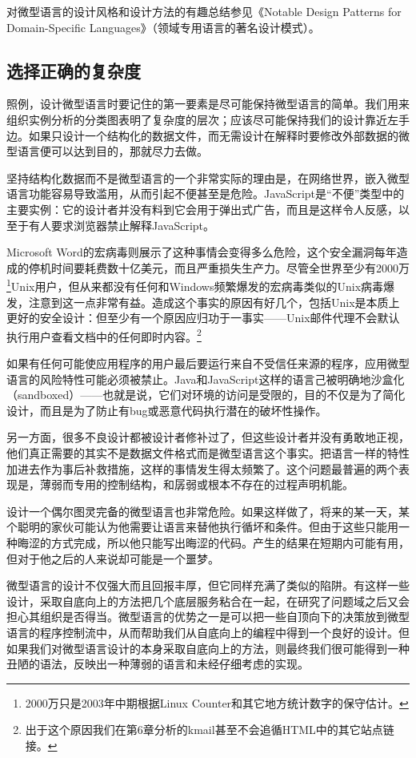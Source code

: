 \documentclass[12pt,oneside]{book}
\begin{document}
对微型语言的设计风格和设计方法的有趣总结参见《Notable Design Patterns for Domain-Specific Languages》（领域专用语言的著名设计模式）\cite{Spinellis}。


\subsection{选择正确的复杂度}
照例，设计微型语言时要记住的第一要素是尽可能保持微型语言的简单。我们用来组织实例分析的分类图表明了复杂度的层次；应该尽可能保持我们的设计靠近左手边。如果只设计一个结构化的数据文件，而无需设计在解释时要修改外部数据的微型语言便可以达到目的，那就尽力去做。

坚持结构化数据而不是微型语言的一个非常实际的理由是，在网络世界，嵌入微型语言功能容易导致滥用，从而引起不便甚至是危险。JavaScript是“不便”类型中的主要实例：它的设计者并没有料到它会用于弹出式广告，而且是这样令人反感，以至于有人要求浏览器禁止解释JavaScript。

Microsoft Word的宏病毒则展示了这种事情会变得多么危险，这个安全漏洞每年造成的停机时间要耗费数十亿美元，而且严重损失生产力。尽管全世界至少有2000万\footnote{2000万只是2003年中期根据Linux Counter和其它地方统计数字的保守估计。}Unix用户，但从来都没有任何和Windows频繁爆发的宏病毒类似的Unix病毒爆发，注意到这一点非常有益。造成这个事实的原因有好几个，包括Unix是本质上更好的安全设计：但至少有一个原因应归功于一事实——Unix邮件代理不会默认执行用户查看文档中的任何即时内容。\footnote{出于这个原因我们在第6章分析的kmail甚至不会追循HTML中的其它站点链接。}

如果有任何可能使应用程序的用户最后要运行来自不受信任来源的程序，应用微型语言的风险特性可能必须被禁止。Java和JavaScript这样的语言己被明确地沙盒化（sandboxed）——也就是说，它们对环境的访问是受限的，目的不仅是为了简化设计，而且是为了防止有bug或恶意代码执行潜在的破坏性操作。

另一方面，很多不良设计都被设计者修补过了，但这些设计者并没有勇敢地正视，他们真正需要的其实不是数据文件格式而是微型语言这个事实。把语言一样的特性加进去作为事后补救措施，这样的事情发生得太频繁了。这个问题最普遍的两个表现是，薄弱而专用的控制结构，和孱弱或根本不存在的过程声明机能。

设计一个偶尔图灵完备的微型语言也非常危险。如果这样做了，将来的某一天，某个聪明的家伙可能认为他需要让语言来替他执行循坏和条件。但由于这些只能用一种晦涩的方式完成，所以他只能写出晦涩的代码。产生的结果在短期内可能有用，但对于他之后的人来说却可能是一个噩梦。

微型语言的设计不仅强大而且回报丰厚，但它同样充满了类似的陷阱。有这样一些设计，采取自底向上的方法把几个底层服务粘合在一起，在研究了问题域之后又会担心其组织是否得当。微型语言的优势之一是可以把一些自顶向下的决策放到微型语言的程序控制流中，从而帮助我们从自底向上的编程中得到一个良好的设计。但如果我们对微型语言设计的本身采取自底向上的方法，则最终我们很可能得到一种丑陋的语法，反映出一种薄弱的语言和未经仔细考虑的实现。
\end{document}
